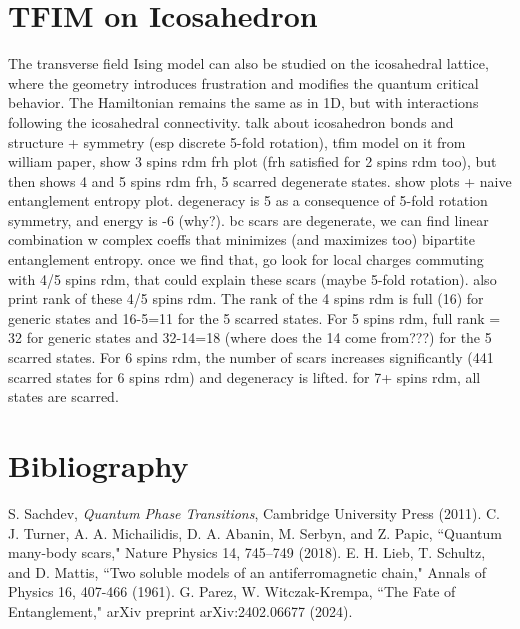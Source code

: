 \documentclass{article}
\begin{document}
\section{TFIM on Icosahedron}
The transverse field Ising model can also be studied on the icosahedral lattice, where the geometry introduces frustration and modifies the quantum critical behavior. The Hamiltonian remains the same as in 1D, but with interactions following the icosahedral connectivity. talk about icosahedron bonds  and structure + symmetry (esp discrete 5-fold rotation), tfim model on it from william paper, show 3 spins rdm frh plot (frh satisfied for  2 spins rdm too), but then shows 4 and 5 spins rdm frh, 5 scarred degenerate states. show plots + naive entanglement entropy plot. degeneracy is 5 as a consequence of 5-fold rotation symmetry, and energy is -6 (why?). bc scars are  degenerate, we can find linear combination w complex coeffs that minimizes (and maximizes too) bipartite entanglement entropy. once we find that, go look for local charges commuting with 4/5 spins rdm, that could explain these scars (maybe 5-fold rotation). also print rank of these 4/5 spins rdm. The rank of the 4 spins rdm is full (16) for generic states and 16-5=11 for the 5 scarred states. For 5 spins rdm, full rank = 32 for generic states and 32-14=18 (where does the 14 come from???) for the 5 scarred states. For 6 spins rdm, the number of scars increases significantly (441 scarred states for 6 spins rdm) and degeneracy is lifted. for 7+ spins rdm, all states are scarred.

\section*{Bibliography}
\begin{thebibliography}{9}
     S. Sachdev, \textit{Quantum Phase Transitions}, Cambridge University Press (2011).
     C. J. Turner, A. A. Michailidis, D. A. Abanin, M. Serbyn, and Z. Papic, ``Quantum many-body scars," Nature Physics 14, 745–749 (2018).
     E. H. Lieb, T. Schultz, and D. Mattis, ``Two soluble models of an antiferromagnetic chain," Annals of Physics 16, 407-466 (1961).
     G. Parez, W. Witczak-Krempa, ``The Fate of Entanglement," arXiv preprint arXiv:2402.06677 (2024).
\end{thebibliography}
\end{document}
